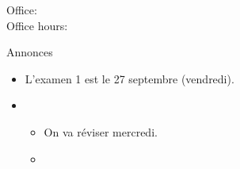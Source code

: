 \documentclass{beamer}
\subtitle[\lexi{Aller} et expressions temporelles]{Le verbe \lexi{aller} et les expressions temporelles}
\begin{document}
  \begin{frame}
    \titlepage
    \tiny{Office: \\
          Office hours: }
  \end{frame}

  \begin{frame}{Annonces }
    \begin{itemize}
      \item L'examen 1 est le 27 septembre (vendredi).
      \item[] 
      \begin{itemize}
        \item On va réviser mercredi.
        \item[] 
      \end{itemize}
    \end{itemize}
  \end{frame}

\end{document}
